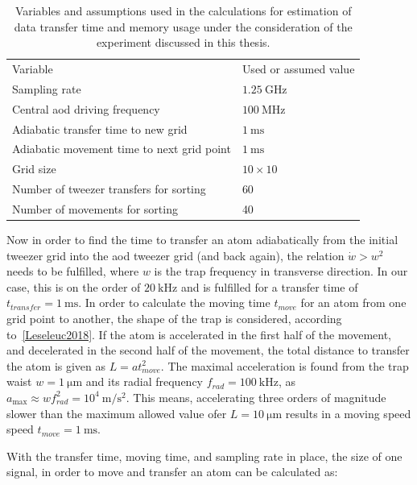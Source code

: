 \begin{table}[tb]%
\label{tbl:spectrum_assumptions}
\centering
\begin{tabular}{l l}
	\toprule \toprule
	Variable & Used or assumed value \\ \thickhline%
	Sampling rate & $\SI{1.25}{\giga\hertz}$ \\
	Central \ac{aod} driving frequency & $\SI{100}{\mega\hertz}$ \\
	Adiabatic transfer time to new grid & $\SI{1}{\milli\second}$ \\
	Adiabatic movement time to next grid point & $\SI{1}{\milli\second}$ \\
	Grid size & $10\times10$ \\
	Number of tweezer transfers for sorting & 60 \\
	Number of movements for sorting & 40 \\
	\bottomrule \bottomrule
\end{tabular}
\caption{Variables and assumptions used in the calculations for estimation of data transfer time and memory usage under the consideration of the experiment discussed in this thesis.}
\end{table}

Now in order to find the time to transfer an atom adiabatically from the initial tweezer grid into the \ac{aod} tweezer grid (and back again), the relation $\dot{w} > w^2$ needs to be fulfilled, where $w$ is the trap frequency in transverse direction. In our case, this is on the order of $\SI{20}{\kilo\hertz}$ and is fulfilled for a transfer time of $t_{transfer} = \SI{1}{\milli\second}$. In order to calculate the moving time $t_{move}$ for an atom from one grid point to another, the shape of the trap is considered, according to~\ref{Leseleuc2018}. If the atom is accelerated in the first half of the movement, and decelerated in the second half of the movement, the total distance to transfer the atom is given as $L=a t_{move}^2$. The maximal acceleration is found from the trap waist $w = \SI{1}{\micro\meter}$ and its radial frequency $f_{rad} = \SI{100}{\kilo\hertz}$, as $a_{\max} \approx w f_{rad}^2 = 10^4\SI{}{\meter\per\second\squared}$. This means, accelerating three orders of magnitude slower than the maximum allowed value ofer $L=\SI{10}{\micro\meter}$ results in a moving speed speed $t_{move} = \SI{1}{\milli\second}$.

With the transfer time, moving time, and sampling rate in place, the size of one signal, in order to move and transfer an atom can be calculated as:

